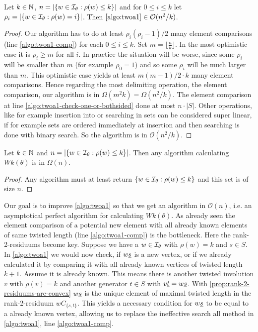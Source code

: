 \begin{lemm}
	Let $k \in \mathbb{N}$, $n = |\{ w \in \mathcal{I}_{\theta} : \rho(w) \leq k \}|$ and for $0 \leq i \leq k$ let $\rho_i = |\{ w \in \mathcal{I}_{\theta} : \rho(w) = i \}|$. Then $\ref{algo:twoa1} \in \mathcal{O}(n^2/k)$.

	\begin{proof}
		Our algorithm has to do at least $\rho_i (\rho_i - 1)/2$ many element comparisons (line \ref{algo:twoa1-comp}) for each $0 \leq i \leq k$. Set $m = \lfloor \frac{n}{k} \rfloor$. In the most optimistic case it is $\rho_i \geq m$ for all $i$. In practice the situation will be worse, since some $\rho_i$ will be smaller than $m$ (for example $\rho_0 = 1$) and so some $\rho_i$ will be much larger than $m$. This optimistic case yields at least $m(m-1)/2 \cdot k$ many element comparisons. Hence regarding the most delimiting operation, the element comparison, our algorithm is in $\Omega(m^2k) = \Omega(n^2 / k)$. The element comparison at line \ref{algo:twoa1-check-one-or-bothsided} done at most $n \cdot |S|$. Other operations, like for example insertion into or searching in sets can be considered super linear, if for example sets are ordered immediately at insertion and then searching is done with binary search. So the algorithm is in $\mathcal{O}(n^2 / k)$.
	\end{proof}
\end{lemm}

\begin{coro}
	Let $k \in \mathbb{N}$ and $n = |\{ w \in \mathcal{I}_{\theta} : \rho(w) \leq k \}|$. Then any algorithm calculating $Wk(\theta)$ is in $\Omega(n)$.

	\begin{proof}
		Any algorithm must at least return $\{ w \in \mathcal{I}_{\theta} : \rho(w) \leq k \}$ and this set is of size $n$.
	\end{proof}
\end{coro}

Our goal is to improve \ref{algo:twoa1} so that we get an algorithm in $\mathcal{O}(n)$, i.e. an asymptotical perfect algorithm for calculating $Wk(\theta)$. As already seen the element comparison of a potential new element with all already known elements of same twisted length (line \ref{algo:twoa1-comp}) is the bottleneck. Here the rank-2-residuums become key. Suppose we have a $w \in \mathcal{I}_{\theta}$ with $\rho(w) = k$ and $s \in S$. In \ref{algo:twoa1} we would now check, if $w \underline{s}$ is a new vertex, or if we already calculated it by comparing it with all already known vertices of twisted length $k + 1$. Assume it is already known. This means there is another twisted involution $v$ with $\rho(v) = k$ and another generator $t \in S$ with $v \underline{t} = w \underline{s}$. With \ref{prop:rank-2-residuums-are-convex} $w \underline{s}$ is the unique element of maximal twisted length in the rank-2-residuum $wC_{\{s,t\}}$. This yields a necessary condition for $w \underline{s}$ to be equal to a already known vertex, allowing us to replace the ineffective search all method in \ref{algo:twoa1}, line \ref{algo:twoa1-comp}.

